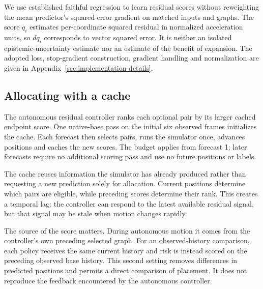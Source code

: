 We use established faithful regression\citep{stirn2023} to learn residual scores without reweighting the mean predictor's squared-error gradient on matched inputs and graphs. The score $q_i$ estimates per-coordinate squared residual in normalized acceleration units, so $dq_i$ corresponds to vector squared error. It is neither an isolated epistemic-uncertainty estimate nor an estimate of the benefit of expansion. The adopted loss, stop-gradient construction, gradient handling and normalization are given in Appendix~\ref{sec:implementation-details}.

\subsection{Allocating with a cache}
The autonomous residual controller ranks each optional pair by its larger cached endpoint score. One native-base pass on the initial six observed frames initializes the cache. Each forecast then selects pairs, runs the simulator once, advances positions and caches the new scores. The budget applies from forecast 1; later forecasts require no additional scoring pass and use no future positions or labels.

The cache reuses information the simulator has already produced rather than requesting a new prediction solely for allocation. Current positions determine which pairs are eligible, while preceding scores determine their rank. This creates a temporal lag: the controller can respond to the latest available residual signal, but that signal may be stale when motion changes rapidly.

The source of the score matters. During autonomous motion it comes from the controller's own preceding selected graph. For an observed-history comparison, each policy receives the same current history and risk is instead scored on the preceding observed base history. This second setting removes differences in predicted positions and permits a direct comparison of placement. It does not reproduce the feedback encountered by the autonomous controller.



